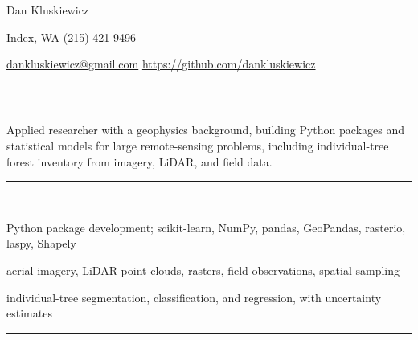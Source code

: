 \documentclass[10pt]{article}
\begin{document}

\centerline{{\Huge \sc Dan Kluskiewicz}}  %
\centerline{Index, WA \textbullet \hspace{5pt} (215) 421-9496}
\centerline{\href{mailto:dankluskiewicz@gmail.com}{dankluskiewicz@gmail.com} 
\textbullet \hspace{5pt}  \url{https://github.com/dankluskiewicz}
}

\noindent

\vspace{1.5mm}
\noindent
\rule{\textwidth}{0.4pt}\\
\vspace{1.5mm}



\noindent Applied researcher with a geophysics background, building Python packages and statistical models for large remote-sensing problems, including individual-tree forest inventory from imagery, LiDAR, and field data.

\vspace{1.5mm}
\noindent
\rule{\textwidth}{0.4pt}\\
\vspace{1.5mm}


 Python package development; scikit-learn, NumPy, pandas, GeoPandas, rasterio, laspy, Shapely

 aerial imagery, LiDAR point clouds, rasters, field observations, spatial sampling

 individual-tree segmentation, classification, and regression, with uncertainty estimates

\vspace{1.5mm}
\noindent
\rule{\textwidth}{0.4pt}\\
\vspace{1.5mm}

\end{document}
